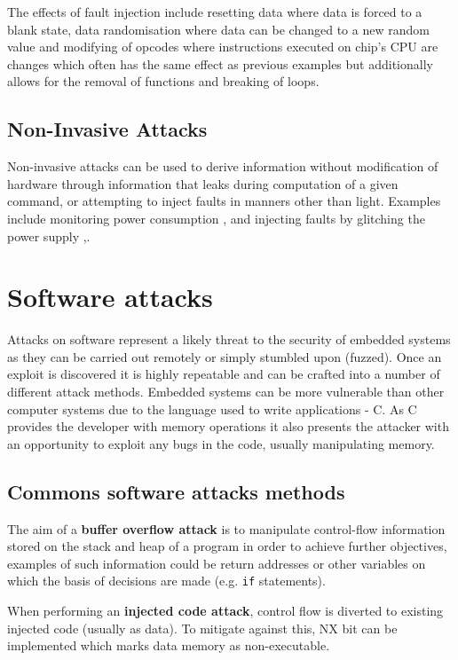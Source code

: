 The effects of fault injection include resetting data where data is forced to a blank state, data randomisation where data can be changed to a new random value and modifying of opcodes where instructions executed on chip's CPU are changes\cite{Anderson1996} which often has the same effect as previous examples but additionally allows for the removal of functions and breaking of loops. 
\ifnotesincluded
{}
\fi
  
\subsection{Non-Invasive Attacks}
Non-invasive attacks can be used to derive information without modification of hardware through information that leaks during computation of a given command, or attempting to inject faults in manners other than light. Examples include monitoring power consumption \cite{Maurer1999},\cite{MangardStefan2007Paa:} and injecting faults by glitching the power supply \cite{Anderson1996},\cite{Bar-el2006}.

\section{Software attacks}

Attacks on software represent a likely threat to the security of embedded systems as they can be carried out remotely or simply stumbled upon (fuzzed). Once an exploit is discovered it is highly repeatable and can be crafted into a number of different attack methods. Embedded systems can be more vulnerable than other computer systems due to the language used to write applications - C. As C provides the developer with memory operations it also presents the attacker with an opportunity to exploit any bugs in the code, usually manipulating memory.

\subsection{Commons software attacks methods}

The aim of a \textbf{buffer overflow attack} is to manipulate control-flow information stored on the stack and heap of a program in order to achieve further objectives, examples of such information could be return addresses or other variables on which the basis of decisions are made (e.g. \verb|if| statements).

When performing an \textbf{injected code attack}, control flow is diverted to existing injected code (usually as data). To mitigate against this, NX bit can be implemented which marks data memory as non-executable.

